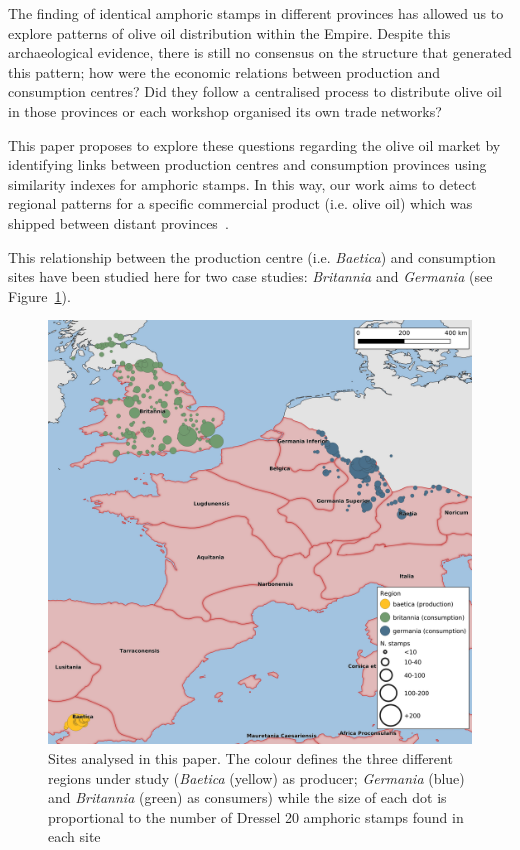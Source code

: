 The finding of identical amphoric stamps in different provinces has allowed us to explore patterns of olive oil distribution within the Empire. Despite this archaeological evidence, there is still no consensus on the structure that generated this pattern; how were the economic relations between production and consumption centres? Did they follow a centralised process to distribute olive oil in those provinces or each workshop organised its own trade networks?
 
This paper proposes to explore these questions regarding the olive oil market by identifying links between production centres and consumption provinces using similarity indexes for amphoric stamps. In this way, our work aims to detect regional patterns for a specific commercial product (i.e. olive oil) which was shipped between distant provinces~\citep{isaksen_network_2006}. 
 
This relationship between the production centre (i.e. \textit{Baetica}) and consumption sites have been studied here for two case studies: \textit{Britannia} and \textit{Germania} (see Figure~\ref{general}).

\begin{figure}[htp]
	\centering
\includegraphics[width=\linewidth]{general_map}
\caption{Sites analysed in this paper. The colour defines the three different regions under study (\textit{Baetica} (yellow) as producer; \textit{Germania} (blue) and \textit{Britannia} (green) as consumers) while the size of each dot is proportional to the number of Dressel 20 amphoric stamps found in each site}

\label{general}
\end{figure} 
        
